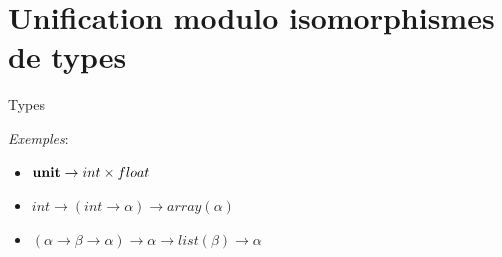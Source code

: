 \documentclass[serif]{beamer}
\newcommand{\exemples}{\textit{Exemples}\xspace}
\newcommand{\unit}{\bold{unit}}
\newcommand{\V}{\mathscr{V}}
\newcommand{\F}{\mathscr{F}}
\newcommand{\T}{\mathrm{T}}
\begin{document}
\section{Unification modulo isomorphismes de types}

%


\begin{frame}{Types}
\exemples :
\begin{itemize}
	\item $\unit \rightarrow int \times float$
	\item $int \rightarrow (int \rightarrow \alpha) \rightarrow array (\alpha)$
	\item $(\alpha \rightarrow \beta \rightarrow \alpha) \rightarrow \alpha \rightarrow list (\beta) \rightarrow \alpha$
\end{itemize}
\end{frame}
\end{document}
